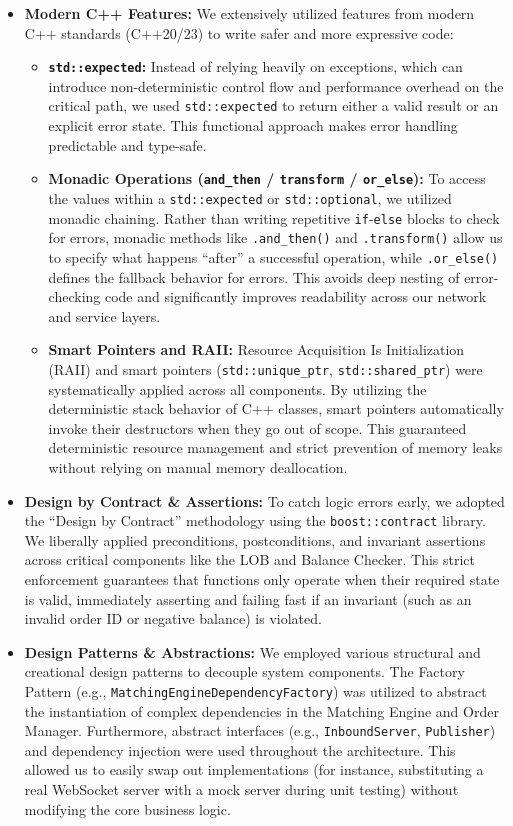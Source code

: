 \documentclass[12pt,a4paper]{article}
\begin{document}
\begin{itemize}
    \item \textbf{Modern C++ Features:} We extensively utilized features from modern C++ standards (C++20/23) to write safer and more expressive code:
    \begin{itemize}
        \item \textbf{\texttt{std::expected}:} Instead of relying heavily on exceptions, which can introduce non-deterministic control flow and performance overhead on the critical path, we used \texttt{std::expected} to return either a valid result or an explicit error state. This functional approach makes error handling predictable and type-safe.
        \item \textbf{Monadic Operations (\texttt{and\_then} / \texttt{transform} / \texttt{or\_else}):} To access the values within a \texttt{std::expected} or \texttt{std::optional}, we utilized monadic chaining. Rather than writing repetitive \texttt{if}-\texttt{else} blocks to check for errors, monadic methods like \texttt{.and\_then()} and \texttt{.transform()} allow us to specify what happens ``after'' a successful operation, while \texttt{.or\_else()} defines the fallback behavior for errors. This avoids deep nesting of error-checking code and significantly improves readability across our network and service layers.
        \item \textbf{Smart Pointers and RAII:} Resource Acquisition Is Initialization (RAII) and smart pointers (\texttt{std::unique\_ptr}, \texttt{std::shared\_ptr}) were systematically applied across all components. By utilizing the deterministic stack behavior of C++ classes, smart pointers automatically invoke their destructors when they go out of scope. This guaranteed deterministic resource management and strict prevention of memory leaks without relying on manual memory deallocation.
    \end{itemize}
    \item \textbf{Design by Contract \& Assertions:} To catch logic errors early, we adopted the ``Design by Contract'' methodology using the \texttt{boost::contract} library. We liberally applied preconditions, postconditions, and invariant assertions across critical components like the LOB and Balance Checker. This strict enforcement guarantees that functions only operate when their required state is valid, immediately asserting and failing fast if an invariant (such as an invalid order ID or negative balance) is violated.
    \item \textbf{Design Patterns \& Abstractions:} We employed various structural and creational design patterns to decouple system components. The Factory Pattern (e.g., \texttt{MatchingEngineDependencyFactory}) was utilized to abstract the instantiation of complex dependencies in the Matching Engine and Order Manager. Furthermore, abstract interfaces (e.g., \texttt{InboundServer}, \texttt{Publisher}) and dependency injection were used throughout the architecture. This allowed us to easily swap out implementations (for instance, substituting a real WebSocket server with a mock server during unit testing) without modifying the core business logic.

\end{itemize}
\end{document}
